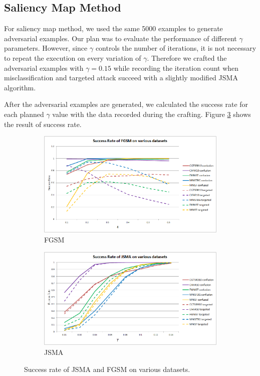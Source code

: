 \documentclass{article}
\begin{document}
\subsection{Saliency Map Method}

For saliency map method, we used the same 5000 examples to generate adversarial examples.
Our plan was to evaluate the performance of different \(\gamma\) parameters.
However, since \(\gamma\) controls the number of iterations, it is not necessary to repeat the execution
on every variation of \(\gamma\).
Therefore we crafted the adversarial examples with \(\gamma=0.15\) while 
recording the iteration count when misclassification and targeted attack succeed with a slightly modified JSMA algorithm.

After the adversarial examples are generated, we calculated the success rate for each planned \(\gamma\) value
with the data recorded during the crafting. Figure \ref{fig:jsma} shows the result of success rate.

\begin{figure}[t!]
    \centering
    \begin{subfigure}[b]{0.49\linewidth}
        \includegraphics[width=\linewidth]{fgsm}
        \caption{FGSM}
        \label{fig:fgsm}
    \end{subfigure}
    \begin{subfigure}[b]{0.49\linewidth}
        \includegraphics[width=\linewidth]{jsma}
        \caption{JSMA}
        \label{fig:jsma}
    \end{subfigure}
    \caption{Success rate of JSMA and FGSM on various datasets.}
\end{figure}
\end{document}
